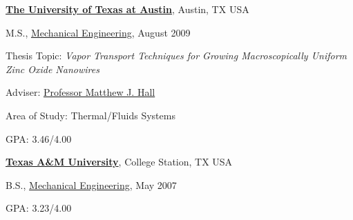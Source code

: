 \documentclass[10pt]{article}
\newenvironment{outerlist}[1][\enskip\textbullet]%
        {\begin{itemize}[#1]}{\end{itemize}%
         \vspace{-.6\baselineskip}}
\newenvironment{innerlist}[1][\enskip\textbullet]%
        {\begin{compactitem}[#1]}{\end{compactitem}}
\newcommand{\blankline}{\quad\pagebreak[2]}
\begin{document}
\blankline

\href{http://www.utexas.edu/}{\textbf{The University of Texas at Austin}}, Austin, TX USA
\begin{outerlist}
\item[] M.S.,
        \href{http://www.me.utexas.edu/}
             {Mechanical Engineering}, August 2009
        \begin{innerlist}
        \item Thesis Topic: \emph{Vapor Transport Techniques for
            Growing Macroscopically Uniform Zinc Oxide Nanowires} 
        \item Adviser:%
              \href{http://www.me.utexas.edu/directory/faculty/hall/matthew/33/}
                   {Professor Matthew J. Hall}
        \item Area of Study: Thermal/Fluids Systems
        \item GPA: 3.46/4.00
        \end{innerlist}
\end{outerlist}

\blankline

\href{http://www.tamu.edu/}{\textbf{Texas A\&M University}}, College Station, TX USA
\begin{outerlist}
\item[] B.S.,
        \href{http://www.mengr.tamu.edu/}{Mechanical Engineering}, May
        2007 
        \begin{innerlist}
        \item GPA: 3.23/4.00
        \end{innerlist}
\end{outerlist}
\end{document}
